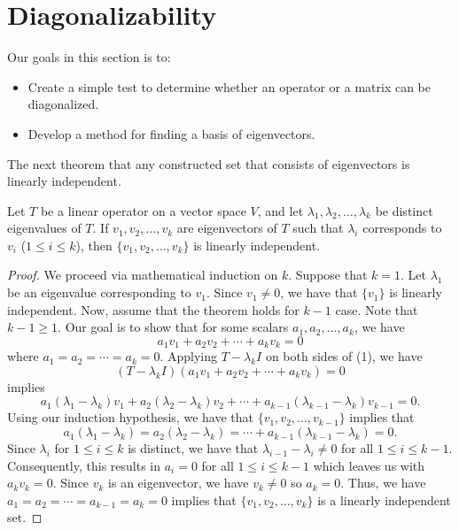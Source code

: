 \section{Diagonalizability}
Our goals in this section is to: 
\begin{itemize}
    \item Create a simple test to determine whether an operator or a matrix can be diagonalized.
    \item Develop a method for finding a basis of eigenvectors.
\end{itemize}

The next theorem that any constructed set that consists of eigenvectors is linearly independent.

\begin{theorem}\label{Theorem 5.5}
    Let \( T  \) be a linear operator on a vector space \( V  \), and let \( {\lambda}_{1}, {\lambda}_{2}, \dots, {\lambda}_{k} \) be distinct eigenvalues of \( T  \). If \( {v}_{1}, {v}_{2}, \dots, {v}_{k} \) are eigenvectors of \( T  \) such that \( {\lambda}_{i} \) corresponds to \( {v}_{i} \) (\( 1 \leq i \leq k  \)), then \( \{ {v}_{1}, {v}_{2}, \dots, {v}_{k } \}  \) is linearly independent.
\end{theorem}
\begin{proof}
We proceed via mathematical induction on \( k  \). Suppose that \( k = 1  \). Let \( \lambda_1  \) be an eigenvalue corresponding to \( {v}_{1} \). Since \( {v}_{1} \neq 0  \), we have that \( \{ {v}_{1} \}  \) is linearly independent. Now, assume that the theorem holds for \( k - 1  \) case. Note that \( k - 1 \geq 1  \). Our goal is to show that for some scalars \( {a}_{1}, {a}_{2}, \dots, {a}_{k}  \), we have  
\[  {a}_{1} {v}_{1} + {a}_{2} {v}_{2} + \cdots + {a}_{k} {v}_{k} = 0 \tag{1}  \]
where \( {a}_{1} = {a}_{2} = \cdots = {a}_{k} = 0  \). Applying \( T - {\lambda}_{k} I  \) on both sides of (1), we have
\[ (T - {\lambda}_{k} I) ({a}_{1} {v}_{1} + {a}_{2} {v}_{2} + \cdots + {a}_{k} {v}_{k} ) = 0   \]
implies
\[  {a}_{1} ({\lambda}_{1} - {\lambda}_{k}) {v}_{1} + {a}_{2} ({\lambda}_{2} - {\lambda}_{k}) {v}_{2} + \cdots + {a}_{k-1} ({\lambda}_{k-1} - {\lambda}_{k}) {v}_{k-1} = 0.  \]
Using our induction hypothesis, we have that \( \{ {v}_{1}, {v}_{2}, \dots, {v}_{k-1} \}  \) implies that 
\[  {a}_{1} ({\lambda}_{1} - {\lambda}_{k}) = {a}_{2} ({\lambda}_{2} - {\lambda}_{k})  = \cdots + {a}_{k-1} ( {\lambda}_{k-1} - {\lambda}_{k} ) = 0.\]
Since \( {\lambda}_{i}  \) for \( 1 \leq i \leq k   \) is distinct, we have that \( {\lambda}_{i-1} - \lambda_{i} \neq  0   \) for all \( 1 \leq i \leq k - 1  \). Consequently, this results in \( {a}_{i} = 0  \) for all \( 1 \leq i \leq k - 1 \) which leaves us with \( {a}_{k} {v}_{k} = 0  \). Since \( {v}_{k} \) is an eigenvector, we have \( {v}_{k} \neq  0  \) so \( {a}_{k} = 0  \). Thus, we have \( {a}_{1} = {a}_{2} = \cdots = {a}_{k-1} = {a}_{k} = 0  \) implies that \( \{ {v}_{1}, {v}_{2}, \dots, {v}_{k} \}   \) is a linearly independent set.   
\end{proof}

